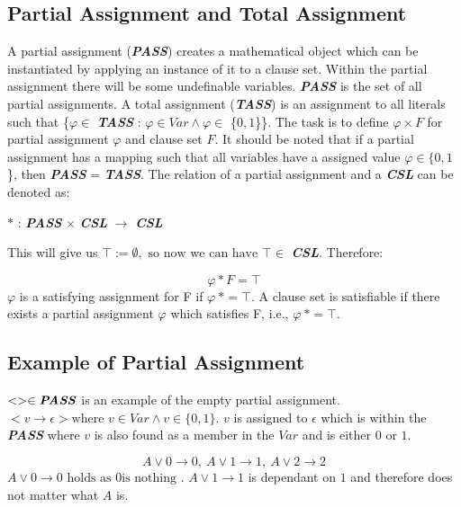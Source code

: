 \documentclass[11pt,a4paper]{report}
\begin{document}
\subsection {Partial Assignment and Total Assignment}
\label{sec:pata}

A partial assignment (\textbf{\textit{PASS}}) creates a mathematical object which can be instantiated by applying an instance of it to a clause set. Within the partial assignment there will be some undefinable variables. \textbf{\textit{PASS}} is the set of all partial assignments.
A total assignment (\textbf{\textit{TASS}}) is an assignment to all literals such that \{$\varphi \in$ \textbf{\textit{TASS}} : $\varphi \in Var \land \varphi \in$ \{$0,1$\}\}. The task is to define $\varphi \times F$ for partial assignment $\varphi$ and clause set $F$. It should be noted that if a partial assignment has a mapping such that all variables have a assigned value $\varphi \in \{0,1$\}, then \textbf{\textit{PASS}} = \textbf{\textit{TASS}}.
The relation of a partial assignment and a \textbf{\textit{CSL}} can be denoted as:

\begin{center}
$\ast$ : \textbf{\textit{PASS}} $\times$ \textbf{\textit{CSL}} $\rightarrow$ \textbf{\textit{CSL}}
\end{center}
This will give us $\top:= \emptyset, \text{ so now we can have } \top \in$ \textbf{\textit{CSL}}. Therefore:

\begin{displaymath}
\varphi \ast F = \top
\end{displaymath}
$\varphi$ is a satisfying assignment for F if $\varphi \: \ast = \top$. A clause set is satisfiable if there exists a partial assignment $\varphi$ which satisfies F, i.e., $\varphi \: \ast = \top$.

\subsection{Example of Partial Assignment}
$<> \in \textbf{\textit{PASS}}$ is an example of the empty partial assignment.
$< v \rightarrow \epsilon > \text{where } v \in Var \land v \in \{0,1\}$. $v$ is assigned to $\epsilon$ which is within the \textbf{\textit{PASS}} where $v$ is also found as a member in the $Var$ and is either $0$ or $1$.

\begin{displaymath}
A \lor 0 \rightarrow 0, \: A \lor 1 \rightarrow 1, \: A \lor 2 \rightarrow 2
\end{displaymath}
$A \lor 0 \rightarrow 0 \text{ holds as }0 \text {is nothing }$. $A \lor 1 \rightarrow 1$ is dependant on $1$ and therefore does not matter what $A$ is.
\end{document}
